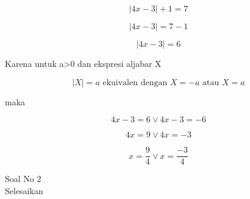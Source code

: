 \begin{eulernotebook}
\begin{eulercomment}
\begin{eulercomment}
\begin{eulercomment}
\end{eulercomment}
\begin{eulerformula}
\[
\left | 4x-3 \right |+1=7
\]
\end{eulerformula}
\begin{eulerformula}
\[
\left | 4x-3 \right |=7-1
\]
\end{eulerformula}
\begin{eulerformula}
\[
\left | 4x-3 \right |=6
\]
\end{eulerformula}
\begin{eulercomment}
Karena untuk a\textgreater{}0 dan ekspresi aljabar X

\end{eulercomment}
\begin{eulerformula}
\[
\left | X \right |=a \text{ ekuivalen dengan } X = -a \text{ atau  } X=a
\]
\end{eulerformula}
\begin{eulercomment}
maka

\end{eulercomment}
\begin{eulerformula}
\[
4x-3=6 \vee 4x-3=-6
\]
\end{eulerformula}
\begin{eulerformula}
\[
4x=9 \vee 4x=-3
\]
\end{eulerformula}
\begin{eulerformula}
\[
x=\frac{9}{4} \vee x=\frac{-3}{4}
\]
\end{eulerformula}
\begin{eulercomment}
\end{eulercomment}
\eulersubheading{}
\begin{eulercomment}
Soal No 2\\
Selesaikan


\end{eulercomment}
\end{eulercomment}
\end{eulercomment}
\end{eulernotebook}
